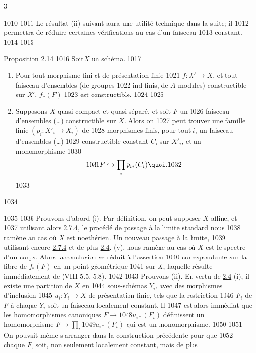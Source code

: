 3	\documentclass[10pt]{../fichiers-configuration-latex/smfart}
\begin{document}
  1010	
  1011	Le résultat (ii) suivant aura une utilité technique dans la suite; il
  1012	permettra de réduire certaines vérifications au cas d'un faisceau
  1013	constant.
  1014	
  1015	\begin{enonce*}{Proposition 2.14}
  1016	Soit\pageoriginale $X$ un schéma.
  1017	\begin{enumerate}
  1018	\renewcommand{\theenumi}{\roman{enumi}}
  1019	\renewcommand{\labelenumi}{(\theenumi)}
  1020	\item Pour tout morphisme fini et de présentation finie
  1021	$f:X'\rightarrow X$, et tout faisceau d'ensembles (\resp de groupes
  1022	ind-finis, \resp de $A$-modules) constructible sur $X'$, $f_{\ast}(F)$
  1023	est constructible.
  1024	
  1025	\item Supposons $X$ quasi-compact et quasi-séparé, et soit $F$ un
  1026	faisceau d'ensembles (\resp\ldots) constructible sur $X$. Alors on
  1027	peut trouver une famille finie $(p_i:X'_i\rightarrow X_i)$ de
  1028	morphismes finis, pour tout $i$, un faisceau d'ensembles (\resp\ldots)
  1029	constructible constant $C_i$ sur $X'_i$, et un monomorphisme
  1030	$$
  1031	F\hookrightarrow \prod_i p_{i\ast}(C_i){\quoi}.
  1032	$$
  1033	\end{enumerate}
  1034	\end{enonce*}
  1035	
  1036	Prouvons d'abord (i). Par définition, on peut supposer $X$ affine, et
  1037	utilisant alors \hyperref[IX.cor2.7.4]{2.7.4}, le procédé de passage à la limite standard nous
  1038	ramène au cas où $X$ est noethérien. Un nouveau passage à la limite,
  1039	utilisant encore \hyperref[IX.cor2.7.4]{2.7.4} et de plus \hyperref[IX.prop2.4]{2.4}. (v), nous ramène au cas où $X$ est le spectre d'un corps. Alors la conclusion se réduit à l'assertion
  1040	correspondante sur la fibre de $f_{\ast}(F)$ en un point géométrique
  1041	sur $X$, laquelle résulte immédiatement de (VIII 5.5, 5.8).
  1042	
  1043	Prouvons (ii). En vertu de \hyperref[IX.prop2.4]{2.4} (i), il existe une partition de $X$ en
  1044	sous-schémas $Y_i$, avec des morphismes d'inclusion
  1045	$u_i:Y_i\rightarrow X$ de présentation finie, tels que la restriction
  1046	$F_i$ de $F$ à chaque $Y_i$ soit un faisceau localement constant. Il
  1047	est alors immédiat que les homomorphismes canoniques $F\rightarrow
  1048	u_{i\ast}(F_i)$ définissent un homomorphisme $F\rightarrow \prod_i
  1049	u_{i\ast}(F_i)$ qui est un monomorphisme.
  1050	
  1051	On pouvait même s'arranger dans la construction précédente pour que
  1052	chaque $F_i$ soit, non seulement localement constant, mais de plus
\end{document}
